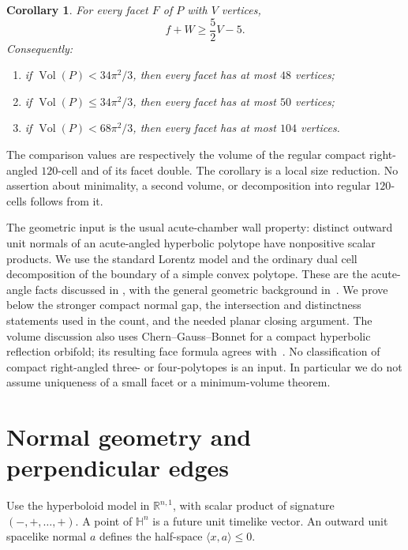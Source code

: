 \documentclass[11pt]{article}
\newtheorem{corollary}[theorem]{Corollary}
\theoremstyle{remark}
\newcommand{\HH}{\mathbb H}
\newcommand{\ip}[2]{\langle #1,#2\rangle}
\newcommand{\Vol}{\operatorname{Vol}}
\begin{document}
\begin{corollary}\label{cor:local-size}
For every facet $F$ of $P$ with $V$ vertices,
\begin{equation}\label{eq:excess-bound}
 f+W\ge\frac52V-5.
\end{equation}
Consequently:
\begin{enumerate}
\item if $\Vol(P)<34\pi^2/3$, then every facet has at most $48$ vertices;
\item if $\Vol(P)\le34\pi^2/3$, then every facet has at most $50$ vertices;
\item if $\Vol(P)<68\pi^2/3$, then every facet has at most $104$ vertices.
\end{enumerate}
\end{corollary}

The comparison values are respectively the volume of the regular compact
right-angled $120$-cell and of its facet double. The corollary is a local
size reduction. No assertion about minimality, a second volume, or
decomposition into regular $120$-cells follows from it.

The geometric input is the usual acute-chamber wall property: distinct
outward unit normals of an acute-angled hyperbolic polytope have
nonpositive scalar products. We use the standard Lorentz model and the
ordinary dual cell decomposition of the boundary of a simple convex
polytope. These are the acute-angle facts discussed in
\cite[pp.~63--64 and Proposition~4.1]{PV}, with the general geometric
background in~\cite{AVS}. We prove below the stronger compact normal gap,
the intersection and distinctness statements used in the count, and the
needed planar closing argument. The volume discussion also uses
Chern--Gauss--Bonnet for a compact hyperbolic reflection orbifold; its
resulting face formula agrees with~\cite[Proposition~3.5(d)]{KP}. No
classification of compact right-angled three- or four-polytopes is an
input. In particular we do not assume uniqueness of a small facet or a
minimum-volume theorem.

\section{Normal geometry and perpendicular edges}

Use the hyperboloid model in $\mathbb R^{n,1}$, with scalar product of
signature $(-,+,\ldots,+)$. A point of $\HH^n$ is a future unit timelike
vector. An outward unit spacelike normal $a$ defines the half-space
$\ip{x}{a}\le0$.
\end{document}
